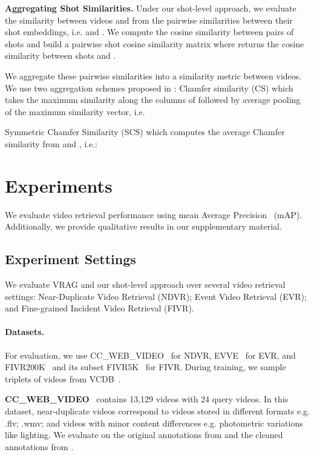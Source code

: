 \documentclass[letterpaper]{article} \usepackage{aaai22}  \usepackage{times}  \usepackage{helvet}  \usepackage{courier}  \usepackage[hyphens]{url}  \usepackage{graphicx} \urlstyle{rm} \usepackage{amsmath}
\begin{document}
\textbf{\label{sect:aggregate-shots}Aggregating Shot Similarities.} Under our shot-level approach, we evaluate the similarity between videos  and  from the pairwise similarities between their shot embeddings, i.e.  and . We compute the cosine similarity between pairs of shots and build a pairwise shot cosine similarity matrix  where  returns the cosine similarity between shots  and .

We aggregate these pairwise similarities into a similarity metric between videos. We use two aggregation schemes proposed in \cite{kordopatiszilos2019visil}: Chamfer similarity (CS) which takes the maximum similarity along the columns of  followed by average pooling of the maximum similarity vector, i.e. 

Symmetric Chamfer Similarity (SCS) which computes the average Chamfer similarity from  and , i.e.:


\section{Experiments}

We evaluate video retrieval performance using mean Average Precision~\cite{dataset:cc-web-video} (mAP). Additionally, we provide qualitative results in our supplementary material.

\subsection{Experiment Settings}

We evaluate VRAG and our shot-level approach over several video retrieval settings: Near-Duplicate Video Retrieval (NDVR); Event Video Retrieval (EVR); and Fine-grained Incident Video Retrieval (FIVR).

\vspace{0mm}
\paragraph{Datasets.} For evaluation, we use CC\_WEB\_VIDEO~\cite{dataset:cc-web-video} for NDVR, EVVE~\cite{dataset:evve} for EVR, and FIVR200K~\cite{dataset:fivr200k} and its subset FIVR5K~\cite{dataset:fivr200k, kordopatiszilos2019visil} for FIVR. During training, we sample triplets of videos from VCDB~\cite{dataset:vcdb}.

\noindent \textbf{CC\_WEB\_VIDEO}~\cite{dataset:cc-web-video} contains 13,129 videos with 24 query videos. In this dataset, near-duplicate videos correspond to videos stored in different formats e.g. .flv; .wmv; and videos with minor content differences e.g. photometric variations like lighting. We evaluate on the original annotations from \cite{dataset:cc-web-video} and the cleaned annotations from \cite{kordopatiszilos2019visil}. 
\end{document}
